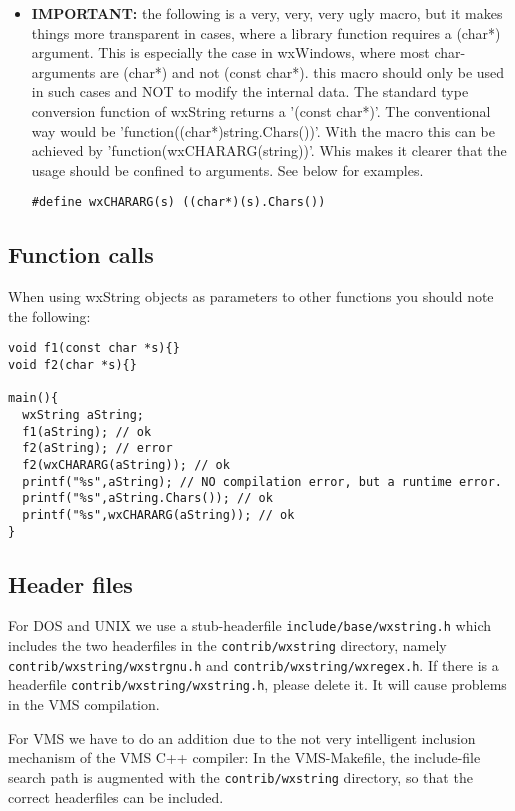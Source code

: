 \begin{itemize}
\item {\bf IMPORTANT:}
the following is a very, very, very ugly macro, but it makes things more
transparent in cases, where a library function requires a 
(char*) argument. This is especially the case in wxWindows,
where most char-arguments are (char*) and not (const char*).
this macro should only be used in such cases and NOT to
modify the internal data. The standard type conversion function
of wxString returns a '(const char*)'.
The conventional way would be 'function((char*)string.Chars())'.
With the macro this can be achieved by 'function(wxCHARARG(string))'.
Whis makes it clearer that the usage should be confined
to arguments. See below for examples.

\begin{verbatim}
#define wxCHARARG(s) ((char*)(s).Chars())  
\end{verbatim}

\end{itemize}

\subsection{Function calls}

When using wxString objects as parameters to other functions you should
note the following:

\begin{verbatim}
void f1(const char *s){}
void f2(char *s){}

main(){
  wxString aString;
  f1(aString); // ok
  f2(aString); // error
  f2(wxCHARARG(aString)); // ok
  printf("%s",aString); // NO compilation error, but a runtime error.
  printf("%s",aString.Chars()); // ok
  printf("%s",wxCHARARG(aString)); // ok
}
\end{verbatim}

\subsection{Header files}

For DOS and UNIX we use a stub-headerfile {\tt include/base/wxstring.h}\rtfsp
which includes the two headerfiles in the {\tt contrib/wxstring} directory,
namely {\tt contrib/wxstring/wxstrgnu.h} and {\tt contrib/wxstring/wxregex.h}.
If there is a headerfile {\tt contrib/wxstring/wxstring.h}, please
delete it. It will cause problems in the VMS compilation.

For VMS we have to do an addition due to the not very intelligent inclusion mechanism
of the VMS C++ compiler:
In the VMS-Makefile, the include-file search path is augmented with the 
{\tt contrib/wxstring} directory, so that the correct headerfiles 
can be included.

